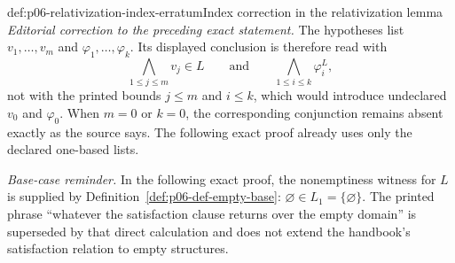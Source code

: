 \begin{hbwarning}{def:p06-relativization-index-erratum}{Index correction in the relativization lemma}
\emph{Editorial correction to the preceding exact statement.}
The hypotheses list \(v_1,\ldots,v_m\) and
\(\varphi_1,\ldots,\varphi_k\).  Its displayed conclusion is therefore read
with
\[
  \bigwedge_{1\leq j\leq m}v_j\in L
  \qquad\text{and}\qquad
  \bigwedge_{1\leq i\leq k}\varphi_i^L,
\]
not with the printed bounds \(j\leq m\) and \(i\leq k\), which would introduce
undeclared \(v_0\) and \(\varphi_0\).  When \(m=0\) or \(k=0\), the
corresponding conjunction remains absent exactly as the source says.  The
following exact proof already uses only the declared one-based lists.
\end{hbwarning}

\noindent\textit{Base-case reminder.}  In the following exact proof, the
nonemptiness witness for \(L\) is supplied by
Definition~\ref{def:p06-def-empty-base}:
\(\varnothing\in L_1=\{\varnothing\}\).  The printed phrase “whatever the
satisfaction clause returns over the empty domain” is superseded by that
direct calculation and does not extend the handbook's satisfaction relation
to empty structures.
